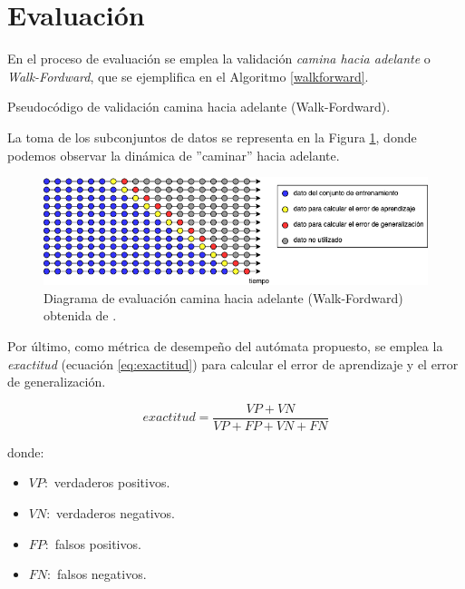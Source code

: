 \section{Evaluación}

En el proceso de evaluación se emplea la validación \emph{camina hacia adelante} o \emph{Walk-Fordward}, que se ejemplifica en el Algoritmo \ref{walkforward}.

\begin{algorithm}[H] 
	\SetAlgoLined
	\caption{Pseudocódigo de validación camina hacia adelante (Walk-Fordward).} \label{walkforward}
\end{algorithm}

La toma de los subconjuntos de datos se representa en la Figura \ref{fig:walkforward}, donde podemos observar la dinámica de ''caminar'' hacia adelante.

\begin{figure}[H]
	\centering
	\includegraphics[width=\linewidth]{fig/walkforward}
	\caption{Diagrama de evaluación camina hacia adelante (Walk-Fordward) obtenida de \cite{hyndman2018forecasting}.}
	\label{fig:walkforward}
\end{figure}

Por último, como métrica de desempeño del autómata propuesto, se emplea la \emph{exactitud} (ecuación \ref{eq:exactitud}) para calcular el error de aprendizaje y el error de generalización.

\begin{equation} \label{eq:exactitud}
exactitud = \frac{VP + VN}{VP+FP+VN+FN} 
\end{equation}

donde:
\begin{itemize}
	\item $VP:$ verdaderos positivos.
	\item $VN:$ verdaderos negativos.
	\item $FP:$ falsos positivos.
	\item $FN:$ falsos negativos. 
\end{itemize}


